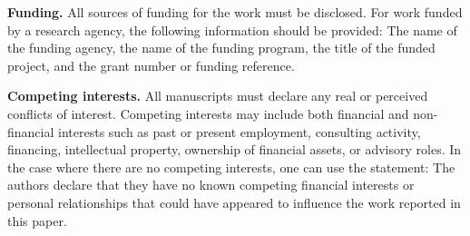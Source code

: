 \documentclass[article,review]{planetary}
\begin{document}
\noindent\textbf{Funding.} All sources of funding for the work must be disclosed. For work funded by a research agency, the following information should be provided: The name of the funding agency, the name of the funding program, the title of the funded project, and the grant number or funding reference.

\noindent\textbf{Competing interests.} All manuscripts must declare any real or perceived conflicts of interest. Competing interests may include both financial and non-financial interests such as past or present employment, consulting activity, financing, intellectual property, ownership of financial assets, or advisory roles. In the case where there are no competing interests, one can use the statement: The authors declare that they have no known competing financial interests or personal relationships that could have appeared to influence the work reported in this paper.

\end{document}
